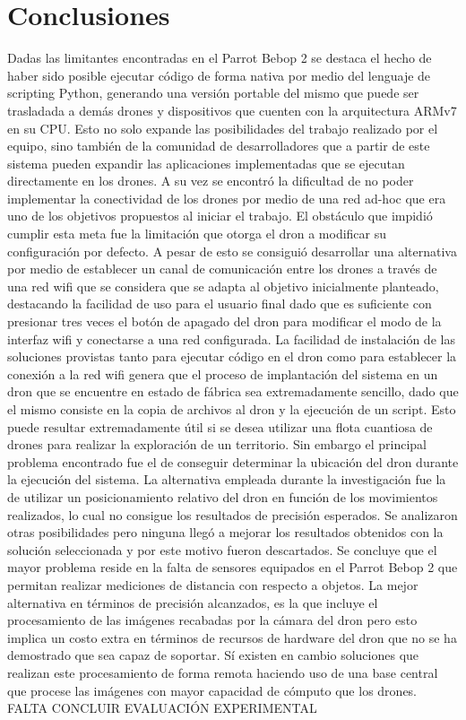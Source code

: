\chapter{Conclusiones}

Dadas las limitantes encontradas en el Parrot Bebop 2 se destaca el hecho de haber sido posible ejecutar código de forma nativa por medio del lenguaje de scripting Python, generando una versión portable del mismo que puede ser trasladada a demás drones y dispositivos que cuenten con la arquitectura ARMv7 en su CPU. Esto no solo expande las posibilidades del trabajo realizado por el equipo, sino también de la comunidad de desarrolladores que a partir de este sistema pueden expandir las aplicaciones implementadas que se ejecutan directamente en los drones.
A su vez se encontró la dificultad de no poder implementar la conectividad de los drones por medio de una red ad-hoc que era uno de los objetivos propuestos al iniciar el trabajo. El obstáculo que impidió cumplir esta meta fue la limitación que otorga el dron a modificar su configuración por defecto. A pesar de esto se consiguió desarrollar una alternativa por medio de establecer un canal de comunicación entre los drones a través de una red wifi que se considera que se adapta al objetivo inicialmente planteado, destacando la facilidad de uso para el usuario final dado que es suficiente con presionar tres veces el botón de apagado del dron para modificar el modo de la interfaz wifi y conectarse a una red configurada.
La facilidad de instalación de las soluciones provistas tanto para ejecutar código en el dron como para establecer la conexión a la red wifi genera que el proceso de implantación del sistema en un dron que se encuentre en estado de fábrica sea extremadamente sencillo, dado que el mismo consiste en la copia de archivos al dron y la ejecución de un script. Esto puede resultar extremadamente útil si se desea utilizar una flota cuantiosa de drones para realizar la exploración de un territorio.
Sin embargo el principal problema encontrado fue el de conseguir determinar la ubicación del dron durante la ejecución del sistema. La alternativa empleada durante la investigación fue la de utilizar un posicionamiento relativo del dron en función de los movimientos realizados, lo cual no consigue los resultados de precisión esperados. Se analizaron otras posibilidades pero ninguna llegó a mejorar los resultados obtenidos con la solución seleccionada y por este motivo fueron descartados. Se concluye que el mayor problema reside en la falta de sensores equipados en el Parrot Bebop 2 que permitan realizar mediciones de distancia con respecto a objetos. La mejor alternativa en términos de precisión alcanzados, es la que incluye el procesamiento de las imágenes recabadas por la cámara del dron pero esto implica un costo extra en términos de recursos de hardware del dron que no se ha demostrado que sea capaz de soportar. Sí existen en cambio soluciones que realizan este procesamiento de forma remota haciendo uso de una base central que procese las imágenes con mayor capacidad de cómputo que los drones.
FALTA CONCLUIR EVALUACIÓN EXPERIMENTAL

